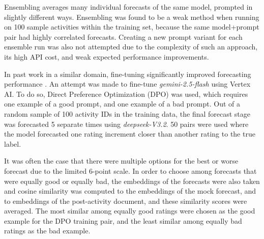 Ensembling averages many individual forecasts of the same model, prompted in slightly different ways. Ensembling was found to be a weak method when running on 100 sample activities within the training set, because the same model+prompt pair had highly correlated forecasts. Creating a new prompt variant for each ensemble run was also not attempted due to the complexity of such an approach, its high API cost, and weak expected performance improvements. 



In past work in a similar domain, fine-tuning significantly improved forecasting performance \citep{wenPredictingEmpiricalAI2025}. An attempt was made to fine-tune \emph{gemini-2.5-flash} using Vertex AI. To do so, Direct Preference Optimization (DPO) was used, which requires one example of a good prompt, and one example of a bad prompt. Out of a random sample of 100 activity IDs in the training data, the final forecast stage was forecasted 5 separate times using \emph{deepseek-V3.2}. 50 pairs were used where the model forecasted one rating increment closer than another rating to the true label.

It was often the case that there were multiple options for the best or worse forecast due to the limited 6-point scale. In order to choose among forecasts that were equally good or equally bad, the embeddings of the forecasts were also taken and cosine similarity was computed to the embeddings of the mock forecast, and to embeddings of the post-activity document, and these similarity scores were averaged. The most similar among equally good ratings were chosen as the good example for the DPO training pair, and the least similar among equally bad ratings as the bad example.  

